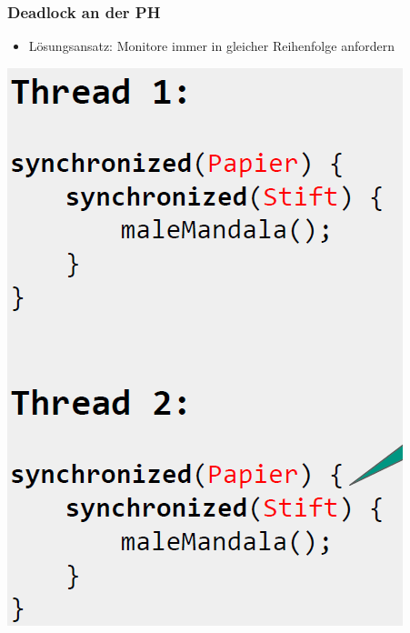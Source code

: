 \documentclass[18pt]{beamer}
\begin{document}
	
	\begin{frame}
		\frametitle{Deadlock an der PH}
		\begin{itemize}
			\item Lösungsansatz: Monitore immer in gleicher Reihenfolge anfordern
		\end{itemize}
		\centering 
		\includegraphics[scale=0.4]{./pics/tut5/deadlock-ex-sol.png}
	\end{frame}
\end{document}

